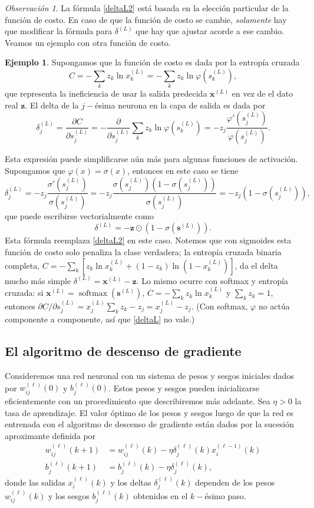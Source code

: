 \documentclass[12pt, a4paper]{amsbook}
\def\softmax{\operatorname {\mathrm{softmax}}}
\newcommand{\sbf}{{\mathbf s}}
\newcommand{\xx}{{\mathbf x}}
\newcommand{\zz}{{\mathbf z}}
\theoremstyle{remark}
\newtheorem{obs}[teo]{Observaci\'on}
\theoremstyle{definition}
\newtheorem{ejem}[teo]{Ejemplo}
\numberwithin{section}{chapter}
\numberwithin{subsection}{section}
\numberwithin{equation}{section}
\numberwithin{figure}{chapter}
\begin{document}
\begin{obs}
La fórmula \eqref{deltaL2} está basada en la elección particular de la función de costo. En caso de que la función de costo se cambie, {\em solamente} hay que modificar la fórmula para $\delta^{(L)}$ que hay que ajustar acorde a ese cambio. Veamos un ejemplo con otra función de costo.
\end{obs}

\begin{ejem}
Supongamos que la función de costo es dada por la entropía cruzada
$$
C = -\sum_k z_k\ln x_k^{(L)} = -\sum_k z_k\ln \varphi(s_k^{(L)}),
$$
que representa la ineficiencia de usar la salida predecida $\xx^{(L)}$ en vez de el dato real $\zz$. El delta de la $j-$ésima neurona en la capa de salida es dada por
$$
\delta_j^{(L)} = \frac{\partial C}{\partial s_j^{(L)}} = -\frac{\partial}{\partial s_j^{(L)}} \sum_k z_k\ln \varphi(s_k^{(L)}) = -z_j \frac{\varphi'(s_j^{(L)})}{\varphi(s_j^{(L)})}.
$$

Esta expresión puede simplificarse aún más para algunas funciones de activación. Supongamos que $\varphi(x)=\sigma(x)$, entonces en este caso se tiene
$$
\delta_j^{(L)} =-z_j \frac{\sigma'(s_j^{(L)})}{\sigma(s_j^{(L)})} = -z_j\frac{\sigma(s_j^{(L)})(1-\sigma(s_j^{(L)}))}{\sigma(s_j^{(L)})} = -z_j (1-\sigma(s_j^{(L)})),
$$
que puede escribirse vectorialmente como
$$
\delta^{(L)} = - \zz\odot (1-\sigma(\sbf^{(L)})).
$$
Esta fórmula reemplaza \eqref{deltaL2} en este caso. Notemos que con sigmoides esta función de costo solo penaliza la clase verdadera; la entropía cruzada binaria completa, $C=-\sum_k[z_k\ln x_k^{(L)}+(1-z_k)\ln(1-x_k^{(L)})]$, da el delta mucho más simple $\delta^{(L)}=\xx^{(L)}-\zz$. Lo mismo ocurre con softmax y entropía cruzada: si $\xx^{(L)}=\softmax(\sbf^{(L)})$, $C=-\sum_kz_k\ln x_k^{(L)}$ y $\sum_kz_k=1$, entonces $\partial C/\partial s_j^{(L)}=x_j^{(L)}\sum_kz_k-z_j=x_j^{(L)}-z_j$. (Con softmax, $\varphi$ no actúa componente a componente, así que \eqref{deltaL} no vale.)
\end{ejem}

\subsection{El algoritmo de descenso de gradiente}

Consideremos una red neuronal con un sistema de pesos y sesgos iniciales dados por $w_{ij}^{(\ell)}(0)$ y $b_j^{(\ell)}(0)$. Estos pesos y sesgos pueden inicializarse eficientemente con un procedimiento que describiremos más adelante. Sea $\eta>0$ la tasa de aprendizaje. El valor óptimo de los pesos y sesgos luego de que la red es entrenada con el algoritmo de descenso de gradiente están dados por la sucesión aproximante definida por
\begin{align*}
w_{ij}^{(\ell)}(k+1) &= w_{ij}^{(\ell)}(k) - \eta \delta_j^{(\ell)}(k) x_i^{(\ell-1)}(k) \\
b_j^{(\ell)}(k+1) &= b_j^{(\ell)}(k) - \eta \delta_j^{(\ell)}(k),
\end{align*}
donde las salidas $x_i^{(\ell)}(k)$ y los deltas $\delta_j^{(\ell)}(k)$ dependen de los pesos $w_{ij}^{(\ell)}(k)$ y los sesgos $b_j^{(\ell)}(k)$ obtenidos en el $k-$ésimo paso.
\end{document}
